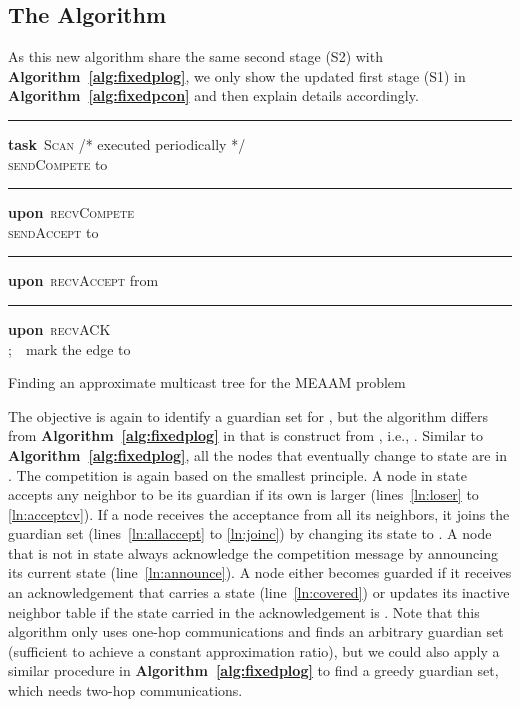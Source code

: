 \documentclass[10pt, conference, compsocconf]{IEEEtran}
\begin{document}
  \subsection{The Algorithm}
As this new algorithm share the same second stage (S2) with \textbf{Algorithm~\ref{alg:fixedplog}}, we only show the updated first stage (S1) in \textbf{Algorithm~\ref{alg:fixedpcon}} and then explain details accordingly.
\begin{algorithm}[h!]
\hrule
\textbf{task}~\textsc{Scan}  \hfill /* \textsf{\small executed periodically} */ \\
      \If {} {
        \textsc{sendCompete} to  \\
}
\hrule
\textbf{upon}~\textsc{recvCompete} \\
\uIf {} { \label{ln:loser}
        \lIf {} {
          \textsc{sendAccept} to   \label{ln:acceptcv}
        }
      }
\hrule
\textbf{upon}~\textsc{recvAccept} from  \label{ln:allaccept} \\
       \label{ln:joinc}
\hrule
\textbf{upon}~\textsc{recvACK} \\
\uIf{} {
        ;~~mark the edge to  \label{ln:covered}
      }
      \lElseIf {} {
         \label{ln:updatenb}
      }
\caption{Finding an approximate multicast tree  for the MEAAM problem} \label{alg:fixedpcon}
    \end{algorithm}

    The objective is again to identify a guardian set  for , but the algorithm differs from \textbf{Algorithm~\ref{alg:fixedplog}} in that  is construct from , i.e., . Similar to \textbf{Algorithm~\ref{alg:fixedplog}}, all the nodes that eventually change to  state are in . The competition is again based on the smallest  principle. A node in  state accepts any neighbor to be its guardian if its own  is larger (lines~\ref{ln:loser} to \ref{ln:acceptcv}). If a node receives the acceptance from all its  neighbors, it joins the guardian set  (lines~\ref{ln:allaccept} to \ref{ln:joinc}) by changing its state to . A node that is not in  state always acknowledge the competition message by announcing its current state (line~\ref{ln:announce}). A node either becomes guarded if it receives an acknowledgement that carries a  state (line~\ref{ln:covered}) or updates its inactive neighbor table if the state carried in the acknowledgement is . Note that this algorithm only uses one-hop communications and finds an arbitrary guardian set (sufficient to achieve a constant approximation ratio), but we could also apply a similar procedure in \textbf{Algorithm~\ref{alg:fixedplog}} to find a greedy guardian set, which needs two-hop communications.
\end{document}
